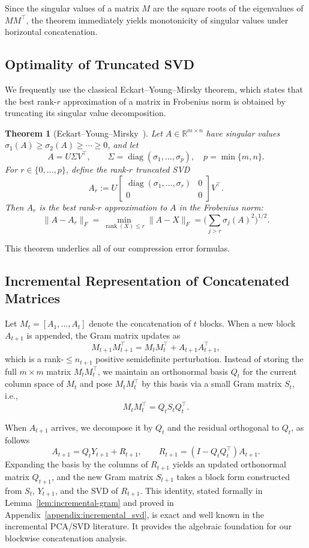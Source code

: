 \documentclass[10pt]{article} %
\newtheorem{theorem}{Theorem}
\begin{document}
Since the singular values of a matrix $M$ are the square roots of the
eigenvalues of $MM^\top$, the theorem immediately yields monotonicity of
singular values under horizontal concatenation.

\subsection{Optimality of Truncated SVD}

We frequently use the classical Eckart--Young--Mirsky theorem, which states
that the best rank-$r$ approximation of a matrix in Frobenius norm is obtained
by truncating its singular value decomposition.

\begin{theorem}[Eckart--Young--Mirsky~\citep{EckartYoung1936, mirsky1960}]
\label{thm:eym}
Let $A\in\mathbb{R}^{m\times n}$ have singular values
$\sigma_1(A)\ge\sigma_2(A)\ge\cdots\ge 0$, 
and let
\[
  A = U \Sigma V^\top,
  \qquad
  \Sigma = \operatorname{diag}(\sigma_1,\dots,\sigma_p),
  \quad
  p=\min\{m,n\}.
\]
For $r\in\{0,\dots,p\}$, define the rank-$r$ truncated SVD
\[
A_r := U
\begin{bmatrix}
  \operatorname{diag}(\sigma_1,\dots,\sigma_r) & 0\\
  0 & 0
\end{bmatrix}
V^\top.
\]
Then $A_r$ is the best rank-$r$ approximation to $A$ in the Frobenius norm:
\[
  \|A - A_r\|_F
  = \min_{\operatorname{rank}(X)\le r} \|A - X\|_F
  = \Bigg(\sum_{j>r} \sigma_j(A)^2\Bigg)^{1/2}.
\]
\end{theorem}

This theorem underlies all of our compression error formulas.

\subsection{Incremental Representation of Concatenated Matrices}

Let $M_t = [A_1,\dots,A_t]$ denote the concatenation of $t$ blocks.  
When a new block $A_{t+1}$ is appended, the Gram matrix updates as
\[
  M_{t+1}M_{t+1}^\top
  = M_t M_t^\top + A_{t+1}A_{t+1}^\top,
\]
which is a rank-$\le n_{t+1}$ positive semidefinite perturbation.
Instead of storing the full $m\times m$ matrix $M_tM_t^\top$, we maintain
an orthonormal basis $Q_t$ for the current column space of $M_t$ and pose
$M_tM_t^\top$ by this basis via a small Gram matrix $S_t$, i.e.,
\[
  M_tM_t^\top = Q_t S_t Q_t^\top.
\]

When $A_{t+1}$ arrives, we decompose it by $Q_t$ and the residual orthogonal to $Q_t$, as follows
\[
  A_{t+1}
  = Q_t Y_{t+1} + R_{t+1},
  \qquad
  R_{t+1} = (I - Q_tQ_t^\top)A_{t+1}.
\]
Expanding the basis by the columns of $R_{t+1}$ yields an updated orthonormal
matrix $Q_{t+1}$, and the new Gram matrix $S_{t+1}$ takes a block form
constructed from $S_t$, $Y_{t+1}$, and the SVD of $R_{t+1}$.  
This identity, stated formally in Lemma~\ref{lem:incremental-gram} and proved 
in Appendix~\ref{appendix:incremental_svd}, is exact and well known in the incremental PCA/SVD literature.  
It provides the algebraic foundation for our blockwise concatenation analysis.
\end{document}
